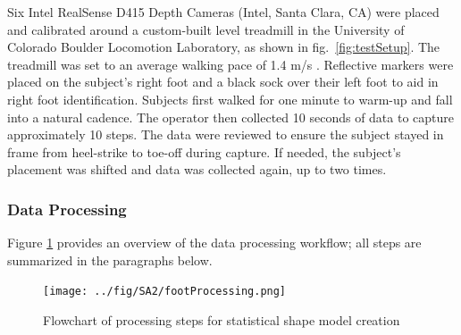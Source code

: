 \documentclass[defaultstyle,11pt]{comps}
\begin{document}
Six Intel RealSense D415 Depth Cameras (Intel, Santa Clara, CA) were placed and calibrated around a custom-built level treadmill in the University of Colorado Boulder Locomotion Laboratory, as shown in fig.~\ref{fig:testSetup}.
The treadmill was set to an average walking pace of 1.4 m/s \citep{Browning2006}.
Reflective markers were placed on the subject's right foot and a black sock over their left foot to aid in right foot identification.
Subjects first walked for one minute to warm-up and fall into a natural cadence.
The operator then collected 10 seconds of data to capture approximately 10 steps.
The data were reviewed to ensure the subject stayed in frame from heel-strike to toe-off during capture. If needed, the subject's placement was shifted and data was collected again, up to two times.

\hypertarget{data-processing}{%
\subsubsection{Data Processing}\label{data-processing}}

Figure \ref{fig:dataflow} provides an overview of the data processing workflow; all steps are summarized in the paragraphs below.

\begin{figure}
\hypertarget{fig:dataflow}{%
\centering
\texttt{[image: ../fig/SA2/footProcessing.png]}
\caption{Flowchart of processing steps for statistical shape model creation}\label{fig:dataflow}
}
\end{figure}
\end{document}
